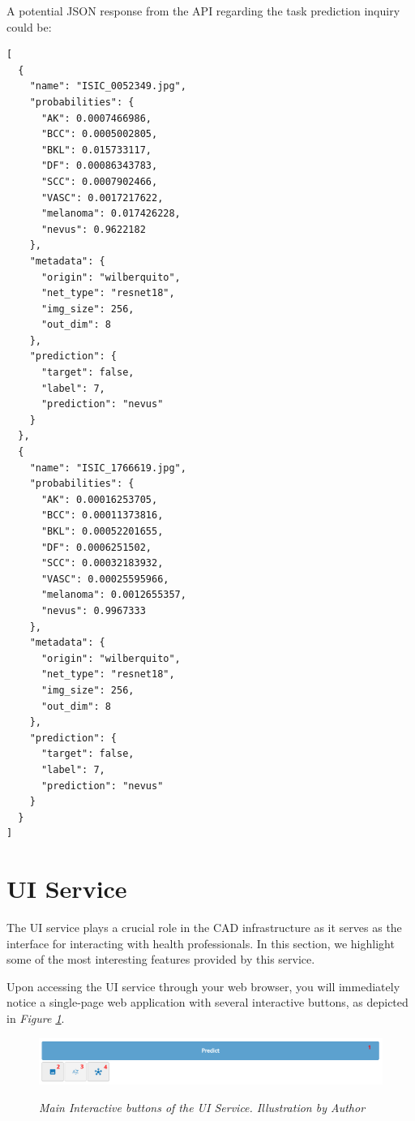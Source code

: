 A potential JSON response from the API regarding the task prediction inquiry
could be:

\begin{Verbatim}[fontsize=\scriptsize]
[
  {
    "name": "ISIC_0052349.jpg",
    "probabilities": {
      "AK": 0.0007466986,
      "BCC": 0.0005002805,
      "BKL": 0.015733117,
      "DF": 0.00086343783,
      "SCC": 0.0007902466,
      "VASC": 0.0017217622,
      "melanoma": 0.017426228,
      "nevus": 0.9622182
    },
    "metadata": {
      "origin": "wilberquito",
      "net_type": "resnet18",
      "img_size": 256,
      "out_dim": 8
    },
    "prediction": {
      "target": false,
      "label": 7,
      "prediction": "nevus"
    }
  },
  {
    "name": "ISIC_1766619.jpg",
    "probabilities": {
      "AK": 0.00016253705,
      "BCC": 0.00011373816,
      "BKL": 0.00052201655,
      "DF": 0.0006251502,
      "SCC": 0.00032183932,
      "VASC": 0.00025595966,
      "melanoma": 0.0012655357,
      "nevus": 0.9967333
    },
    "metadata": {
      "origin": "wilberquito",
      "net_type": "resnet18",
      "img_size": 256,
      "out_dim": 8
    },
    "prediction": {
      "target": false,
      "label": 7,
      "prediction": "nevus"
    }
  }
]
\end{Verbatim}

\section{UI Service}

The UI service plays a crucial role in the CAD infrastructure as it serves as
the interface for interacting with health professionals. In this section, we
highlight some of the most interesting features provided by this service.

Upon accessing the UI service through your web browser, you will immediately
notice a single-page web application with several interactive buttons, as
depicted in \textit{Figure \ref{fig:ui-tools}}.

\begin{figure}[H]
  \centering
  \includegraphics[width=\textwidth]{imatges/results/ui-tools.png}
  \caption[Main Interactive buttons of the UI Service]{\textit{Main Interactive buttons of the UI Service. Illustration by Author}}
  {\label{fig:ui-tools}}
\end{figure}

